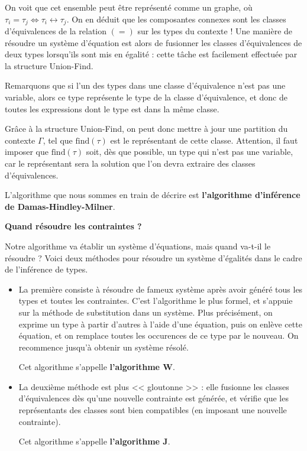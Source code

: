 \documentclass[11pt]{article}
\begin{document}
On voit que cet ensemble peut être représenté comme un graphe, où $\tau_i=\tau_j\iff\tau_i\longleftrightarrow \tau_j$. On en déduit que les composantes connexes sont les classes d'équivalences de la relation $(=)$ sur les types du contexte ! Une manière de résoudre un système d'équation est alors de fusionner les classes d'équivalences de deux types lorsqu'ils sont mis en égalité : cette tâche est facilement effectuée par la structure Union-Find.

Remarquons que si l'un des types dans une classe d'équivalence n'est pas une variable, alors ce type représente le type de la classe d'équivalence, et donc de toutes les expressions dont le type est dans la même classe.

Grâce à la structure Union-Find, on peut donc mettre à jour une partition du contexte $\Gamma$, tel que $\text{find}(\tau)$ est le représentant de cette classe. Attention, il faut imposer que $\text{find}(\tau)$ soit, dès que possible, un type qui n'est pas une variable, car le représentant sera la solution que l'on devra extraire des classes d'équivalences.

\begin{remark}
    L'algorithme que nous sommes en train de décrire est \textbf{l'algorithme d'inférence de Damas-Hindley-Milner}.
\end{remark}

\textbf{Quand résoudre les contraintes ?}

Notre algorithme va établir un système d'équations, mais quand va-t-il le résoudre ? Voici deux méthodes pour résoudre un système d'égalités dans le cadre de l'inférence de types. \begin{itemize}
    \item La première consiste à résoudre de fameux système après avoir généré tous les types et toutes les contraintes. C'est l'algorithme le plus formel, et s'appuie sur la méthode de substitution dans un système. Plus précisément, on exprime un type à partir d'autres à l'aide d'une équation, puis on enlève cette équation, et on remplace toutes les occurences de ce type par le nouveau. On recommence jusqu'à obtenir un système résolé.
    
    Cet algorithme s'appelle \textbf{l'algorithme W}.

    \item La deuxième méthode est plus << gloutonne >> : elle fusionne les classes d'équivalences dès qu'une nouvelle contrainte est générée, et vérifie que les représentants des classes sont bien compatibles (en imposant une nouvelle contrainte).
    
    Cet algorithme s'appelle \textbf{l'algorithme J}.
\end{itemize}
\end{document}
